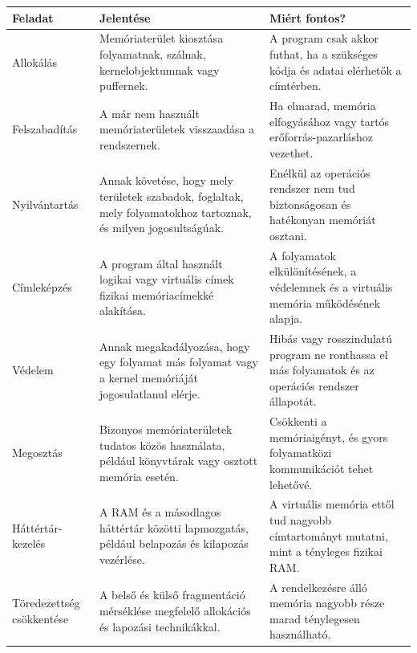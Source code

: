 \begin{tabularx}{\textwidth}{L{35mm}X X}
\toprule
\textbf{Feladat} & \textbf{Jelentése} & \textbf{Miért fontos?} \\
\midrule
Allokálás & Memóriaterület kiosztása folyamatnak, szálnak, kernelobjektumnak vagy puffernek. & A program csak akkor futhat, ha a szükséges kódja és adatai elérhetők a címtérben. \\
Felszabadítás & A már nem használt memóriaterületek visszaadása a rendszernek. & Ha elmarad, memória elfogyásához vagy tartós erőforrás-pazarláshoz vezethet. \\
Nyilvántartás & Annak követése, hogy mely területek szabadok, foglaltak, mely folyamatokhoz tartoznak, és milyen jogosultságúak. & Enélkül az operációs rendszer nem tud biztonságosan és hatékonyan memóriát osztani. \\
Címleképzés & A program által használt logikai vagy virtuális címek fizikai memóriacímekké alakítása. & A folyamatok elkülönítésének, a védelemnek és a virtuális memória működésének alapja. \\
Védelem & Annak megakadályozása, hogy egy folyamat más folyamat vagy a kernel memóriáját jogosulatlanul elérje. & Hibás vagy rosszindulatú program ne ronthassa el más folyamatok és az operációs rendszer állapotát. \\
Megosztás & Bizonyos memóriaterületek tudatos közös használata, például könyvtárak vagy osztott memória esetén. & Csökkenti a memóriaigényt, és gyors folyamatközi kommunikációt tehet lehetővé. \\
Háttértár-kezelés & A RAM és a másodlagos háttértár közötti lapmozgatás, például belapozás és kilapozás vezérlése. & A virtuális memória ettől tud nagyobb címtartományt mutatni, mint a tényleges fizikai RAM. \\
Töredezettség csökkentése & A belső és külső fragmentáció mérséklése megfelelő allokációs és lapozási technikákkal. & A rendelkezésre álló memória nagyobb része marad ténylegesen használható. \\
\bottomrule
\end{tabularx}
